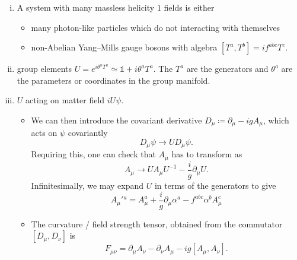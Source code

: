 \begin{enumerate}[(i)]
  \item A system with many massless helicity $1$  fields is either 
    \begin{itemize}
      \item many photon-like particles which do not interacting with themselves
      \item non-Abelian Yang--Mills gauge bosons with algebra $[T^a, T^b] = i f^{abc} T^c$.
    \end{itemize}
  \item group elements $U = e^{i \theta^a T^a} \simeq \mathbb{1} + i \theta^a T^a$. The $T^a$ are the generators and  $\theta^a$ are the parameters or coordinates in the group manifold.
   \item $U$  acting on matter field $i U \psi$. 
     \begin{itemize}
       \item We can then introduce the covariant derivative $D_{\mu} \coloneqq \partial_{\mu} - i g A_{\mu}$, which acts on $\psi$ covariantly
       \begin{equation}
         D_{\mu} \psi \to U D_{\mu} \psi.
       \end{equation} 
       Requiring this, one can check that $A_{\mu}$ has to transform as
       \begin{equation}
         A_{\mu} \to U A_{\mu} U^{-1} - \frac{i}{g} \partial_{\mu} U.
       \end{equation}
       Infinitesimally, we may expand $U$ in terms of the generators to give
       \begin{equation}
         A_{\mu}'{}^a = A^a_{\mu} + \frac{i}{g} \partial_{\mu} \alpha^a - f^{abc} \alpha^b A^c_{\mu}
       \end{equation}
       \item The curvature / field strength tensor, obtained from the commutator $[D_{\mu}, D_{\nu}]$ is
	 \begin{equation}
	   F_{\mu\nu} = \partial_{\mu} A_{\nu} - \partial_{\nu} A_{\mu} - i g [A_{\mu}, A_{\nu}].
	 \end{equation}
     \end{itemize}
\end{enumerate}
